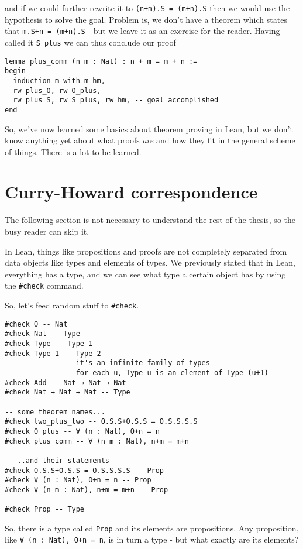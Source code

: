 \documentclass{book}
\theoremstyle{definition}
\theoremstyle{remark}
\theoremstyle{plain}
\begin{document}
and if we could further rewrite it to \lstinline{(n+m).S = (m+n).S} then we would use the hypothesis
to solve the goal.
Problem is, we don't have a theorem which states that \lstinline{m.S+n = (m+n).S} - but we leave it as an exercise for the reader.
Having called it \lstinline{S_plus} we can thus conclude our proof
\begin{lstlisting}
lemma plus_comm (n m : Nat) : n + m = m + n :=
begin
  induction m with m hm,
  rw plus_O, rw O_plus,
  rw plus_S, rw S_plus, rw hm, -- goal accomplished
end
\end{lstlisting}
So, we've now learned some basics about theorem proving in Lean,
but we don't know anything yet about what proofs \textit{are} and how they fit in the general scheme of things.
There is a lot to be learned.

\section{Curry-Howard correspondence}

The following section is not necessary to understand the rest of the thesis,
so the busy reader can skip it.

In Lean, things like propositions and proofs are not completely separated from data objects like types and elements of types.
We previously stated that in Lean, everything has a type, and we can see what type a certain object has by using the \lstinline{#check} command.

So, let's feed random stuff to \lstinline{#check}.
\begin{lstlisting}
#check O -- Nat
#check Nat -- Type
#check Type -- Type 1
#check Type 1 -- Type 2
              -- it's an infinite family of types
              -- for each u, Type u is an element of Type (u+1)
#check Add -- Nat → Nat → Nat
#check Nat → Nat → Nat -- Type

-- some theorem names...
#check two_plus_two -- O.S.S+O.S.S = O.S.S.S.S
#check O_plus -- ∀ (n : Nat), O+n = n
#check plus_comm -- ∀ (n m : Nat), n+m = m+n

-- ..and their statements
#check O.S.S+O.S.S = O.S.S.S.S -- Prop
#check ∀ (n : Nat), O+n = n -- Prop
#check ∀ (n m : Nat), n+m = m+n -- Prop

#check Prop -- Type
\end{lstlisting}
So, there is a type called \lstinline{Prop} and its elements are propositions.
Any proposition, like \lstinline{∀ (n : Nat), O+n = n}, is in turn a type - but what exactly are its elements?
\end{document}
